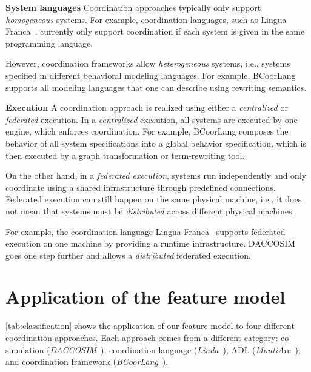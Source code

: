 \documentclass[runningheads]{llncs}
\newcommand{\feature}[1]{\textbf{#1}}
\begin{document}
\feature{System languages} Coordination approaches typically only support \textit{homogeneous} systems.
For example, coordination languages, such as Lingua Franca~\cite{lohstrohReactorsDeterministicModel2020}, currently only support coordination if each system is given in the same programming language.

However, coordination frameworks allow \textit{heterogeneous} systems, i.e., systems specified in different behavioral modeling languages.
For example, BCoorLang~\cite{krauterBehavioralConsistencyMultimodeling2023} supports all modeling languages that one can describe using rewriting semantics.

\feature{Execution} A coordination approach is realized using either a \textit{centralized} or \textit{federated} execution.
In a \textit{centralized} execution, all systems are executed by one engine, which enforces coordination.
For example, BCoorLang composes the behavior of all system specifications into a global behavior specification, which is then executed by a graph transformation or term-rewriting tool.

On the other hand, in a \textit{federated execution}, systems run independently and only coordinate using a shared infrastructure through predefined connections.
Federated execution can still happen on the same physical machine, i.e., it does not mean that systems must be \textit{distributed} across different physical machines. 

For example, the coordination language Lingua Franca~\cite{lohstrohReactorsDeterministicModel2020} supports federated execution on one machine by providing a runtime infrastructure.
DACCOSIM~\cite{galtierFMIBasedDistributedMultisimulation2015} goes one step further and allows a \textit{distributed} federated execution.


\section{Application of the feature model} \label{sec: application}
\autoref{tab:classification} shows the application of our feature model to four different coordination approaches.
Each approach comes from a different category: co-simulation (\textit{DACCOSIM}~\cite{galtierFMIBasedDistributedMultisimulation2015,dadSynthesisFeedbackDistribution2021}), coordination language (\textit{Linda}~\cite{carrieroLindaContext1989,carrieroLindaAlternativeMessagepassing1994}), ADL (\textit{MontiArc}~\cite{haberMontiArcArchitecturalModeling2014}), and coordination framework (\textit{BCoorLang}~\cite{krauterBehavioralConsistencyHeterogeneous2021,krauterBehavioralConsistencyMultimodeling2023}).
\end{document}
